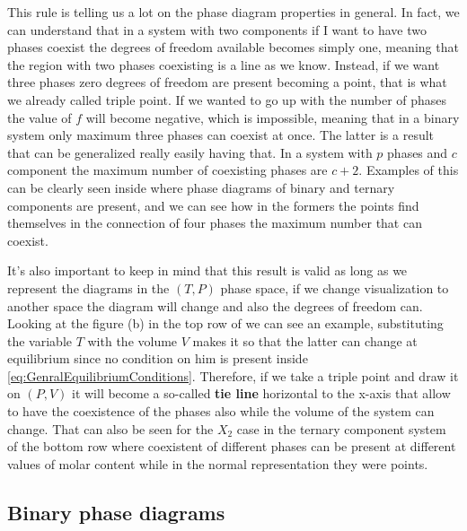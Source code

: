 \noindent
This rule is telling us a lot on the phase diagram properties in general. In fact, we can understand that in a system with two components if I want to have two phases coexist the degrees of freedom available becomes simply one, meaning that the region with two phases coexisting is a line as we know. Instead, if we want three phases zero degrees of freedom are present becoming a point, that is what we already called triple point. If we wanted to go up with the number of phases the value of $f$ will become negative, which is impossible, meaning that in a binary system only maximum three phases can coexist at once. The latter is a result that can be generalized really easily having that.
{
    In a system with $p$ phases and $c$ component the maximum number of coexisting phases are $c + 2$.
}
\noindent
Examples of this can be clearly seen inside  where phase diagrams of binary and ternary components are present, and we can see how in the formers the points find themselves in the connection of four phases the maximum number that can coexist.

It's also important to keep in mind that this result is valid as long as we represent the diagrams in the $(T, P)$ phase space, if we change visualization to another space the diagram will change and also the degrees of freedom can. Looking at the figure (b) in the top row of  we can see an example, substituting the variable $T$ with the volume $V$ makes it so that the latter can change at equilibrium since no condition on him is present inside \eqref{eq:GenralEquilibriumConditions}. Therefore, if we take a triple point and draw it on $(P,V)$ it will become a so-called \textbf{tie line} horizontal to the x-axis that allow to have the coexistence of the phases also while the volume of the system can change. That can also be seen for the $X_2$ case in the ternary component system of the bottom row where coexistent of different phases can be present at different values of molar content while in the normal representation they were points.

\subsection{Binary phase diagrams}

